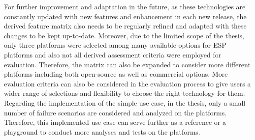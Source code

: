 For further improvement and adaptation in the future, as these technologies are constantly updated with new features and enhancement in each new release, the derived feature matrix also needs to be regularly refined and adapted with these changes to be kept up-to-date. Moreover, due to the limited scope of the thesis, only three platforms were selected among many available options for ESP platforms and also not all derived assessment criteria were employed for evaluation. Therefore, the matrix can also be expanded to consider more different platforms including both open-source as well as commercial options. More evaluation criteria can also be considered in the evaluation process to give users a wider range of selections and flexibility to choose the right technology for them. Regarding the implementation of the simple use case, in the thesis, only a small number of failure scenarios are considered and analyzed on the platforms. Therefore, this implemented use case can serve further as a reference or a playground to conduct more analyses and tests on the platforms.


 

